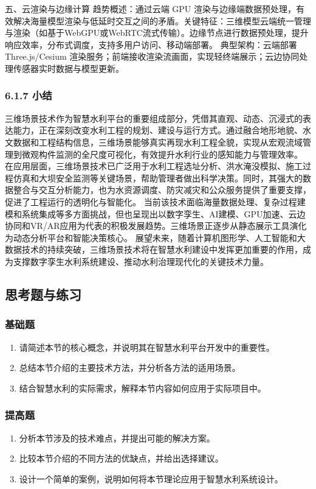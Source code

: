 {五、云渲染与边缘计算 趋势概述：通过云端 GPU
渲染与边缘端数据预处理，有效解决海量模型渲染与低延时交互之间的矛盾。关键特征：三维模型云端统一管理与渲染（如基于WebGPU或WebRTC流式传输）。边缘节点进行数据预处理，提升响应效率，分布式调度，支持多用户访问、移动端部署。
典型架构：云端部署 Three.js/Cesium 渲染服务；前端接收渲染流画面，实现轻终端展示；云边协同处理传感器实时数据与模型更新。 \subsubsection{6.1.7 小结}\label{ux5c0fux7ed3}
三维场景技术作为智慧水利平台的重要组成部分，凭借其直观、动态、沉浸式的表达能力，正在深刻改变水利工程的规划、建设与运行方式。通过融合地形地貌、水文数据和工程结构信息，三维场景能够真实再现水利工程全貌，实现从宏观流域管理到微观构件监测的全尺度可视化，有效提升水利行业的感知能力与管理效率。
在应用层面，三维场景技术已广泛用于水利工程选址分析、洪水淹没模拟、施工过程仿真和大坝安全监测等关键场景，帮助管理者做出科学决策。同时，其强大的数据整合与交互分析能力，也为水资源调度、防灾减灾和公众服务提供了重要支撑，促进了工程运行的透明化与智能化。
当前该技术面临海量数据处理、复杂过程建模和系统集成等多方面挑战，但也呈现出以数字孪生、AI建模、GPU加速、云边协同和VR/AR应用为代表的积极发展趋势。三维场景正逐步从静态展示工具演化为动态分析平台和智能决策核心。
展望未来，随着计算机图形学、人工智能和大数据技术的持续突破，三维场景技术将在智慧水利建设中发挥更加重要的作用，成为支撑数字孪生水利系统建设、推动水利治理现代化的关键技术力量。
\subsection{思考题与练习}\label{ux601dux8003ux9898ux4e0eux7ec3ux4e60-2} \subsubsection{基础题}\label{ux57faux7840ux9898-2}
\begin{enumerate} \def\labelenumi{\arabic{enumi}.} \tightlist \item 请简述本节的核心概念，并说明其在智慧水利平台开发中的重要性。 \item
总结本节介绍的主要技术方法，并分析各方法的适用场景。 \item 结合智慧水利的实际需求，解释本节内容如何应用于实际项目中。 \end{enumerate}
\subsubsection{提高题}\label{ux63d0ux9ad8ux9898-2} \begin{enumerate} \def\labelenumi{\arabic{enumi}.} \tightlist \item
分析本节涉及的技术难点，并提出可能的解决方案。 \item 比较本节介绍的不同方法的优缺点，并给出选择建议。 \item 设计一个简单的案例，说明如何将本节理论应用于智慧水利系统设计。 \end{enumerate}
}
